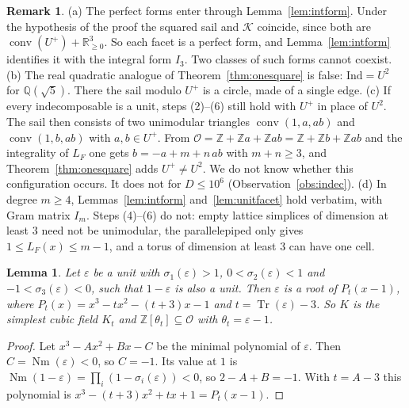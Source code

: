 \documentclass[11pt,reqno]{amsart}
\theoremstyle{plain}
\newtheorem{lemma}[theorem]{Lemma}
\theoremstyle{definition}
\newtheorem{remark}[theorem]{Remark}
\newcommand{\Z}{\mathbb{Z}}
\newcommand{\Q}{\mathbb{Q}}
\newcommand{\R}{\mathbb{R}}
\newcommand{\Nm}{\operatorname{Nm}}
\newcommand{\Tr}{\operatorname{Tr}}
\newcommand{\conv}{\operatorname{conv}}
\begin{document}
\begin{remark}\label{rem:onlyunits}
(a) The perfect forms enter through Lemma~\ref{lem:intform}. Under the hypothesis of the proof the squared sail
and $\mathcal K$ coincide, since both are $\conv(U^+)+\R^3_{\ge0}$. So each facet is a perfect form, and
Lemma~\ref{lem:intform} identifies it with the integral form $I_3$. Two classes of such forms cannot coexist.
(b) The real quadratic analogue of Theorem~\ref{thm:onesquare} is false: $\mathrm{Ind}=U^2$ for $\Q(\sqrt5)$. There
the sail modulo $U^+$ is a circle, made of a single edge.
(c) If every indecomposable is a unit, steps (2)--(6) still hold with $U^+$ in place of $U^2$. The sail then
consists of two unimodular triangles $\conv(1,a,ab)$ and $\conv(1,b,ab)$ with $a,b\in U^+$. From
$\mathcal O=\Z+\Z a+\Z ab=\Z+\Z b+\Z ab$ and the integrality of $L_F$ one gets $b=-a+m+n\,ab$ with $m+n\ge3$, and
Theorem~\ref{thm:onesquare} adds $U^+\ne U^2$. We do not know whether this configuration occurs. It does not
for $D\le10^6$ (Observation~\ref{obs:indec}).
(d) In degree $m\ge4$, Lemmas~\ref{lem:intform} and~\ref{lem:unitfacet} hold verbatim, with Gram matrix $I_m$.
Steps (4)--(6) do not: empty lattice simplices of dimension at least $3$ need not be unimodular, the
parallelepiped only gives $1\le L_F(x)\le m-1$, and a torus of dimension at least $3$ can have one cell.
\end{remark}

\begin{lemma}\label{lem:signpattern}
Let $\varepsilon$ be a unit with $\sigma_1(\varepsilon)>1$, $0<\sigma_2(\varepsilon)<1$ and $-1<\sigma_3(\varepsilon)<0$, such
that $1-\varepsilon$ is also a unit. Then $\varepsilon$ is a root of $P_t(x-1)$, where
$P_t(x)=x^3-tx^2-(t+3)x-1$ and $t=\Tr(\varepsilon)-3$. So $K$ is the simplest cubic field $K_t$ and
$\Z[\theta_t]\subseteq\mathcal O$ with $\theta_t=\varepsilon-1$.
\end{lemma}

\begin{proof}
Let $x^3-Ax^2+Bx-C$ be the minimal polynomial of $\varepsilon$. Then $C=\Nm(\varepsilon)<0$, so $C=-1$. Its value
at $1$ is $\Nm(1-\varepsilon)=\prod_i(1-\sigma_i(\varepsilon))<0$, so $2-A+B=-1$. With $t=A-3$ this polynomial is
$x^3-(t+3)x^2+tx+1=P_t(x-1)$.
\end{proof}
\end{document}
